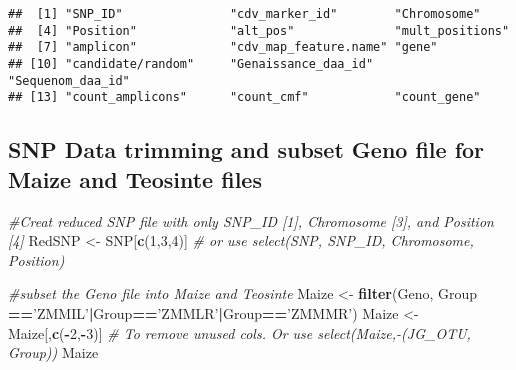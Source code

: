 \documentclass[]{article}
\newenvironment{Shaded}{\begin{snugshade}}{\end{snugshade}}
\newcommand{\KeywordTok}[1]{\textcolor[rgb]{0.13,0.29,0.53}{\textbf{#1}}}
\newcommand{\DecValTok}[1]{\textcolor[rgb]{0.00,0.00,0.81}{#1}}
\newcommand{\StringTok}[1]{\textcolor[rgb]{0.31,0.60,0.02}{#1}}
\newcommand{\CommentTok}[1]{\textcolor[rgb]{0.56,0.35,0.01}{\textit{#1}}}
\newcommand{\OperatorTok}[1]{\textcolor[rgb]{0.81,0.36,0.00}{\textbf{#1}}}
\newcommand{\NormalTok}[1]{#1}
\begin{document}
\begin{verbatim}
##  [1] "SNP_ID"               "cdv_marker_id"        "Chromosome"          
##  [4] "Position"             "alt_pos"              "mult_positions"      
##  [7] "amplicon"             "cdv_map_feature.name" "gene"                
## [10] "candidate/random"     "Genaissance_daa_id"   "Sequenom_daa_id"     
## [13] "count_amplicons"      "count_cmf"            "count_gene"
\end{verbatim}

\subsection{SNP Data trimming and subset Geno file for Maize and
Teosinte
files}\label{snp-data-trimming-and-subset-geno-file-for-maize-and-teosinte-files}

\begin{Shaded}
\begin{Highlighting}[]
\CommentTok{#Creat reduced SNP file with only SNP_ID [1], Chromosome [3], and Position [4]}
\NormalTok{RedSNP <-}\StringTok{ }\NormalTok{SNP[}\KeywordTok{c}\NormalTok{(}\DecValTok{1}\NormalTok{,}\DecValTok{3}\NormalTok{,}\DecValTok{4}\NormalTok{)] }\CommentTok{# or use select(SNP, SNP_ID, Chromosome, Position)}

\CommentTok{#subset the Geno file into Maize and Teosinte}
\NormalTok{Maize <-}\StringTok{ }\KeywordTok{filter}\NormalTok{(Geno, Group }\OperatorTok{==}\StringTok{'ZMMIL'}\OperatorTok{|}\NormalTok{Group}\OperatorTok{==}\StringTok{'ZMMLR'}\OperatorTok{|}\NormalTok{Group}\OperatorTok{==}\StringTok{'ZMMMR'}\NormalTok{)}
\NormalTok{Maize <-}\StringTok{ }\NormalTok{Maize[,}\KeywordTok{c}\NormalTok{(}\OperatorTok{-}\DecValTok{2}\NormalTok{,}\OperatorTok{-}\DecValTok{3}\NormalTok{)] }\CommentTok{# To remove unused cols. Or use select(Maize,-(JG_OTU, Group))}
\NormalTok{Maize}
\end{Highlighting}
\end{Shaded}
\end{document}
